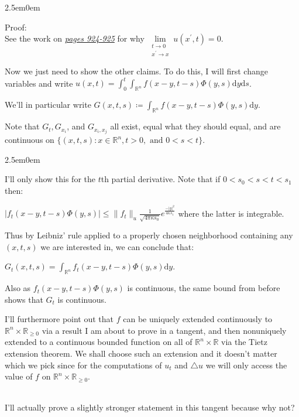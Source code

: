 \documentclass{book}
\newcommand{\inLinkRap}[2]{{\color{blue}\hyperlink{#1}{\textit{#2}}}}
\newcommand{\pracOne}{
   \color{BrickRed}%
   \fontsize{13}{15}\selectfont%
}
\newcommand{\exThreeP}{%
   \color{RedViolet}%
   \fontsize{12}{14}\selectfont%
}
\newcommand{\exPPP}{%
   \color{VioletRed}%
   \fontsize{12}{14}\selectfont%
}
\newenvironment{myIndent}{%
   \begin{adjustwidth}{2.5em}{0em}%
}{%
   \end{adjustwidth}%
}
\newcommand{\df}{\mathrm{d}}
\newcommand{\mySepTwo}[1][.]{%
   {\noindent\color{#1}{\rule{6.5in}{0.5mm}}}\\%
}
\newcommand{\retTwo}{\hfill\bigbreak}
\begin{document}
\begin{myIndent}\exThreeP
	Proof:\\
	See the work on \inLinkRap{incomplete proof page 925}{pages 924-925} for why $\lim\limits_{\substack{t \to 0 \\ x^\prime \to x}}u(x^\prime, t) = 0$.\retTwo
	
	Now we just need to show the other claims. To do this, I will first change variables and write $u(x, t) = \int_0^t \int_{\mathbb{R}^n} f(x - y, t - s)\Phi(y, s) \df y \df s$.\retTwo

	We'll in particular write $G(x, t, s) \coloneqq \int_{\mathbb{R}^n} f(x - y, t - s)\Phi(y, s)\df y$.\retTwo

	Note that $G_t, G_{x_i}$, and $G_{x_i, x_j}$ all exist, equal what they should equal, and are continuous on $\{(x, t, s) : x \in \mathbb{R}^n, t > 0, \text{ and } 0 < s < t\}$.
	\begin{myIndent}\exPPP
		I'll only show this for the $t$th partial derivative. Note that if $0 < s_0 < s < t < s_1$ then:
		
		{\centering$|f_t(x - y, t - s)\Phi(y, s)| \leq \|f_t\|_u\frac{1}{\sqrt{4 \pi \kappa s_0}} e^{\frac{-|y|^2}{4\kappa s_1}}$ where the latter is integrable.\retTwo\par}

		Thus by Leibniz' rule applied to a properly chosen neighborhood containing any $(x, t, s)$ we are interested in, we can conclude that:
		
		{\centering$G_t(x, t, s) = \int_{\mathbb{R}^n} f_t(x - y, t - s)\Phi(y, s)\df y$.\retTwo\par}
		
		Also as $f_t(x - y, t - s)\Phi(y, s)$ is continuous, the same bound from before shows that $G_t$ is continuous.\retTwo
	\end{myIndent}

	I'll furthermore point out that $f$ can be uniquely extended continuously to $\mathbb{R}^n \times \mathbb{R}_{\geq 0}$ via a result I am about to prove in a tangent, and then nonuniquely extended to a continuous bounded function on all of $\mathbb{R}^n \times \mathbb{R}$ via the Tietz extension theorem. We shall choose such an extension and it doesn't matter which we pick since for the computations of $u_t$ and $\triangle u$ we will only access the value of $f$ on $\mathbb{R}^n \times \mathbb{R}_{\geq 0}$.
\end{myIndent}
\pracOne\mySepTwo
I'll actually prove a slightly stronger statement in this tangent because why not?\retTwo
\end{document}
